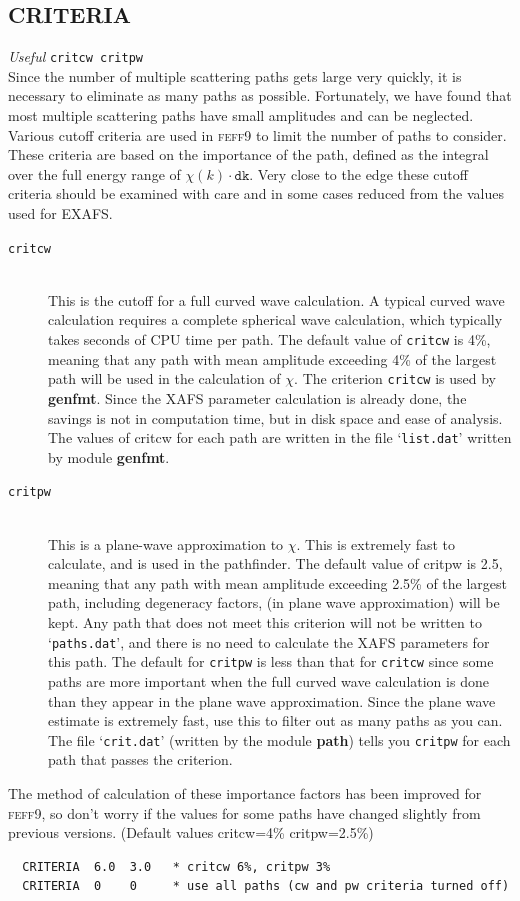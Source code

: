 \documentclass[11pt,oneside]{report} %
\newcommand{\program}[1]{\textsc{#1}}
\newcommand{\feff}{\program{feff}}
\newcommand{\vnum}{9}
\newcommand{\feffcur}{\feff\vnum}
\newenvironment{Card}[4]%
      {\vspace{3ex}%
        \subsection{#1}
        \quad\textsl{#3}\newline
        \quad\texttt{#2}\newline%
        \label{card:#4}\\}
      {}
\newcommand{\file}[1]{`\texttt{#1}'}
\newcommand{\module}[1]{\textrm{\bf{#1}}}
\begin{document}
\begin{Card}{CRITERIA}{critcw critpw}{Useful}{cri}
  Since the number of multiple scattering paths gets large very
  quickly, it is necessary to eliminate as many paths as possible.
  Fortunately, we have found that most multiple scattering paths have
  small amplitudes and can be neglected. Various cutoff criteria
  are used in {\feffcur} to limit the number of paths to consider. These
  criteria are based on the importance of the path, defined as the
  integral over the full energy range of $\chi(k)\cdot\mathtt{dk}$.
  Very close to the edge these cutoff criteria should be examined
  with care and in some cases reduced from the values used for EXAFS.
 \begin{description}
  \item[\texttt{critcw}]\hfill\\ 
  This is the cutoff for a full curved wave calculation. A
  typical curved wave calculation requires a complete spherical wave
  calculation, which typically takes seconds of CPU time per path.
  The default value of \texttt{critcw} is 4\%, meaning that any path
  with mean amplitude exceeding 4\% of the largest path will be used in
  the calculation of $\chi$. The criterion \texttt{critcw} is used by 
  \module{genfmt}.
  Since the XAFS parameter calculation is already done, the savings is
  not in computation time, but in disk space and ease of analysis. The
  values of critcw for each path are written in the file \file{list.dat}
  written by module \module{genfmt}.

  \item[\texttt{critpw}]\hfill\\ 
  This is a plane-wave approximation to $\chi$. This is
  extremely fast to calculate, and is used in the pathfinder. The
  default value of critpw is 2.5, meaning that any path with mean
  amplitude exceeding 2.5\% of the largest path, including degeneracy 
  factors, (in plane wave approximation) will be kept. Any path that does 
  not meet this criterion will not be written to \file{paths.dat}, and 
  there is no need to calculate the XAFS parameters for this path. The
  default for \texttt{critpw} is less than that for \texttt{critcw}
  since some paths are more important when the full curved wave
  calculation is done than they appear in the plane wave
  approximation. Since the plane wave estimate is extremely fast, use
  this to filter out as many paths as you can. The file
  \file{crit.dat} (written by the module \module{path}) tells you
  \texttt{critpw} for each path that passes the criterion.
 \end{description}
  The method of calculation of these importance factors has been
  improved for {\feffcur}, so don't worry if the values for
  some paths have changed slightly from previous versions. (Default
  values critcw=4\% critpw=2.5\%)

\begin{verbatim}
  CRITERIA  6.0  3.0   * critcw 6%, critpw 3%
  CRITERIA  0    0     * use all paths (cw and pw criteria turned off)
\end{verbatim}
\end{Card}
\end{document}
